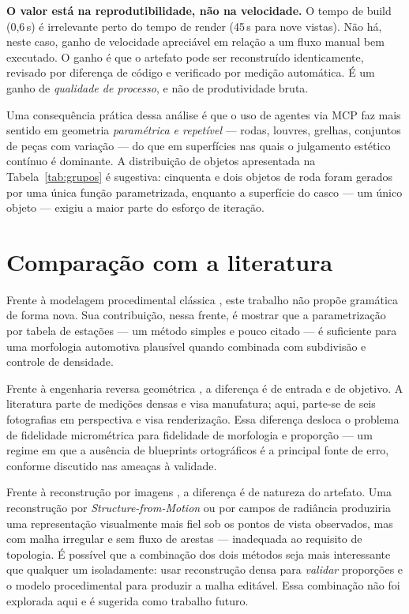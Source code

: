 \textbf{O valor est\'a na reprodutibilidade, n\~ao na velocidade.} O tempo de build
(0,6\,s) \'e irrelevante perto do tempo de render (45\,s para nove vistas). N\~ao h\'a,
neste caso, ganho de velocidade apreci\'avel em rela{\c{c}}\~ao a um fluxo manual bem
executado. O ganho \'e que o artefato pode ser reconstru\'ido identicamente, revisado por
diferen{\c{c}}a de c\'odigo e verificado por medi{\c{c}}\~ao autom\'atica. \'E um ganho
de \emph{qualidade de processo}, e n\~ao de produtividade bruta.

Uma consequ\^encia pr\'atica dessa an\'alise \'e que o uso de agentes via MCP faz mais
sentido em geometria \emph{param\'etrica e repet\'ivel} --- rodas, louvres, grelhas,
conjuntos de pe{\c{c}}as com varia{\c{c}}\~ao --- do que em superf\'icies nas quais o
julgamento est\'etico cont\'inuo \'e dominante. A distribui{\c{c}}\~ao de objetos
apresentada na Tabela~\ref{tab:grupos} \'e sugestiva: cinquenta e dois objetos de roda
foram gerados por uma \'unica fun{\c{c}}\~ao parametrizada, enquanto a superf\'icie do
casco --- um \'unico objeto --- exigiu a maior parte do esfor{\c{c}}o de itera{\c{c}}\~ao.

\section{Compara{\c{c}}\~ao com a literatura}

Frente \`a modelagem procedimental cl\'assica \cite{parish2001, muller2006, mccormack2004},
este trabalho n\~ao prop\~oe gram\'atica de forma nova. Sua contribui{\c{c}}\~ao, nessa
frente, \'e mostrar que a parametriza{\c{c}}\~ao por tabela de esta{\c{c}}\~oes --- um
m\'etodo simples e pouco citado --- \'e suficiente para uma morfologia automotiva
plaus\'ivel quando combinada com subdivis\~ao e controle de densidade.

Frente \`a engenharia reversa geom\'etrica \cite{varady1997, otto2001}, a diferen{\c{c}}a
\'e de entrada e de objetivo. A literatura parte de medi{\c{c}}\~oes densas e visa
manufatura; aqui, parte-se de seis fotografias em perspectiva e visa renderiza{\c{c}}\~ao.
Essa diferen{\c{c}}a desloca o problema de fidelidade microm\'etrica para fidelidade de
morfologia e propor{\c{c}}\~ao --- um regime em que a aus\^encia de blueprints
ortogr\'aficos \'e a principal fonte de erro, conforme discutido nas
amea{\c{c}}as \`a validade.

Frente \`a reconstru{\c{c}}\~ao por imagens \cite{snavely2006, mildenhall2020, kerbl2023}, a
diferen{\c{c}}a \'e de natureza do artefato. Uma reconstru{\c{c}}\~ao por
\emph{Structure-from-Motion} ou por campos de radi\^ancia produziria uma representa{\c{c}}\~ao
visualmente mais fiel sob os pontos de vista observados, mas com malha irregular e sem
fluxo de arestas --- inadequada ao requisito de topologia. \'E poss\'ivel que a
combina{\c{c}}\~ao dos dois m\'etodos seja mais interessante que qualquer um isoladamente:
usar reconstru{\c{c}}\~ao densa para \emph{validar} propor{\c{c}}\~oes e o modelo
procedimental para produzir a malha edit\'avel. Essa combina{\c{c}}\~ao n\~ao foi
explorada aqui e \'e sugerida como trabalho futuro.

